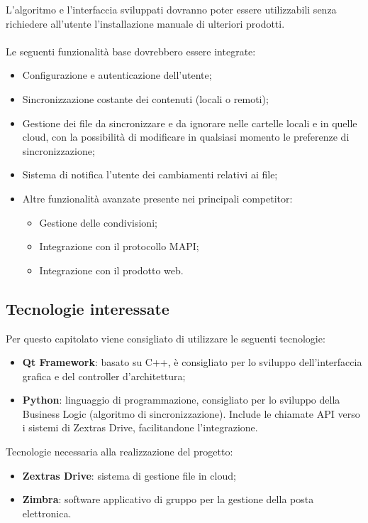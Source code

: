 \documentclass[../studio-di-fattibilita.tex]{subfiles}
\begin{document}
L’algoritmo e l’interfaccia sviluppati dovranno poter essere utilizzabili senza richiedere all’utente l’installazione manuale di ulteriori prodotti.\\ \\

Le seguenti funzionalità base dovrebbero essere integrate:
\begin{itemize}
  \item Configurazione e autenticazione dell’utente;
  \item Sincronizzazione costante dei contenuti (locali o remoti);
  \item Gestione dei file da sincronizzare e da ignorare nelle cartelle locali e in quelle cloud, con la possibilità di modificare in qualsiasi momento le preferenze di sincronizzazione;
  \item Sistema di notifica l’utente dei cambiamenti relativi ai file; 
  \item Altre funzionalità avanzate presente nei principali competitor:
  \begin{itemize}
    \item Gestione delle condivisioni;
    \item Integrazione con il protocollo MAPI;
    \item Integrazione con il prodotto web.
  \end{itemize}
\end{itemize}

\subsection{Tecnologie interessate}%
\label{sub:c7_tecnologie_interessate}
Per questo capitolato viene consigliato di utilizzare le seguenti tecnologie:
\begin{itemize}
  \item \textbf{Qt Framework}: basato su C++, è consigliato per lo sviluppo dell’interfaccia grafica e del controller d’architettura;
  \item \textbf{Python}: linguaggio di programmazione, consigliato per lo sviluppo della Business Logic (algoritmo di sincronizzazione). Include le chiamate API verso i sistemi di Zextras Drive, facilitandone l’integrazione.
\end{itemize}

Tecnologie necessaria alla realizzazione del progetto:
\begin{itemize}
  \item \textbf{Zextras Drive}: sistema di gestione file in cloud;
  \item \textbf{Zimbra}: software applicativo di gruppo per la gestione della posta elettronica.
\end{itemize}
\end{document}
